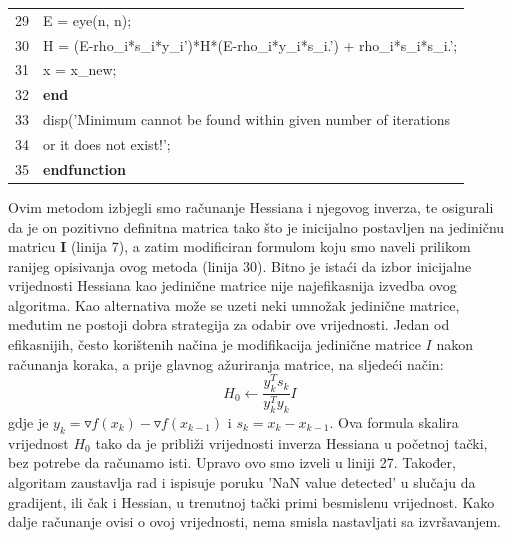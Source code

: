 \documentclass[bosnian,12pt,a4paper]{report}
\begin{document}
\begin{tabular}{ll}
29 & \hspace*{2cm}E = eye(n, n); 
\\
30 & \hspace*{2cm}H = (E-rho_i*s_i*y_i')*H*(E-rho_i*y_i*s_i.') + rho_i*s_i*s_i.'; 
\\
31 & \hspace*{2cm}x = x_new; 
\\
32 & \hspace*{1cm}\textbf{end                                                                                       } \\
33 & \hspace*{1cm}disp('Minimum cannot be found within given number of iterations                                                          \\
34 & \hspace*{2cm}or it does not exist!'; 
\\
35 & \textbf{endfunction}                                                                               \\ \hline
\end{tabular}


\vspace*{0.5cm}

\justify
Ovim metodom izbjegli smo računanje Hessiana i njegovog inverza, te osigurali da je on pozitivno definitna matrica tako što je inicijalno postavljen na jediničnu matricu \textbf{I} (linija 7), a zatim modificiran formulom koju smo naveli prilikom ranijeg opisivanja ovog metoda (linija 30).
\justify
Bitno je istaći da izbor inicijalne vrijednosti Hessiana kao jedinične matrice nije najefikasnija izvedba ovog algoritma. Kao alternativa može se uzeti neki umnožak jedinične matrice, međutim ne postoji dobra strategija za odabir ove vrijednosti. Jedan od efikasnijih, često korištenih načina je modifikacija jedinične matrice $I$ nakon računanja koraka, a prije glavnog ažuriranja matrice, na sljedeći način:
$$ H_0 \leftarrow \frac{y_k^Ts_k}{y_k^Ty_k}I $$
gdje je $y_k = \triangledown f(x_k) - \triangledown f(x_{k-1})$ i $s_k = x_k - x_{k-1}$. Ova formula skalira vrijednost $H_0$ tako da je približi vrijednosti inverza Hessiana u početnoj tački, bez potrebe da računamo isti. Upravo ovo smo izveli u liniji 27. 
\justify
Također, algoritam zaustavlja rad i ispisuje poruku 'NaN value detected' u slučaju da gradijent, ili čak i Hessian, u trenutnoj tački primi besmislenu vrijednost. Kako dalje računanje ovisi o ovoj vrijednosti, nema smisla nastavljati sa izvršavanjem. 
 
\end{document}
